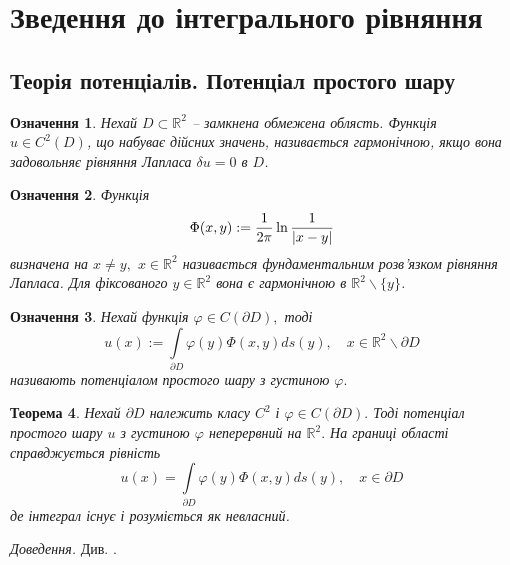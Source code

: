 \documentclass[14pt,a4paper]{extarticle}
\newcounter{e}
\newtheorem{theorem}{Теорема}[section]
\newtheorem{defn}[theorem]{Означення}
\newcommand{\proof}{\textit{Доведення. \space}}
\numberwithin{equation}{section}
\numberwithin{figure}{section}
\newcommand{\intl}{\int\limits}
\begin{document}
 \newpage
 \thispagestyle{empty}
 \section{Зведення до інтегрального рівняння}
 \subsection{Теорія потенціалів. Потенціал простого шару}

\begin{defn}
	\label{harminic-func}
	Нехай $D \subset \mathbb{R}^2$ -- замкнена обмежена облясть. Функція $u \in C^2(D)$, що набуває дійсних значень, називається гармонічною, якщо вона задовольняє рівняння Лапласа $\delta u = 0$ в $D$.
\end{defn}

 \begin{defn}
	 \label{fundamental-solution}  
	 Функція
 	 \begin{equation}
		 \Phi(x, y) := \frac{1}{2\pi} \ln \frac{1}{\abs{x - y}} 
	 \end{equation}
	 визначена на  $x \neq y,$ $x \in \mathbb{R}^2$ називається фундаментальним розв'язком рівняння Лапласа. Для фіксованого $y \in \mathbb{R}^2$ вона є гармонічною в $\mathbb{R}^2 \backslash \{y\}$.
 \end{defn}
  
 \begin{defn}
	\label{single-layer-potential}
	 Нехай функція $\varphi \in C(\partial D),$ тоді
	 \begin{equation}
		 u(x):=\intl_{\partial D} \varphi(y) \Phi(x, y) d s(y), \quad x \in \mathbb{R}^{2} \backslash \partial D
	 \end{equation}
	 називають потенціалом простого шару з густиною $\varphi .$
 \end{defn}

 \begin{theorem}
 	 \label{potential-on-bound} 
	 Нехай $\partial D$ належить класу $C^{2}$ і $\varphi \in C(\partial D) .$ Тоді потенціал простого шару $u$ з густиною $\varphi$ неперервний на $\mathbb{R}^{2} .$ На границі області справджується рівність
	 \begin{equation}
		 u(x)=\intl_{\partial D} \varphi(y) \Phi(x, y) d s(y), \quad x \in \partial D
	 \end{equation}
	 де інтеграл існує і розуміється як невласний.
 \end{theorem}
 \proof Див. \cite{kress2012linear}.
 
\end{document}
